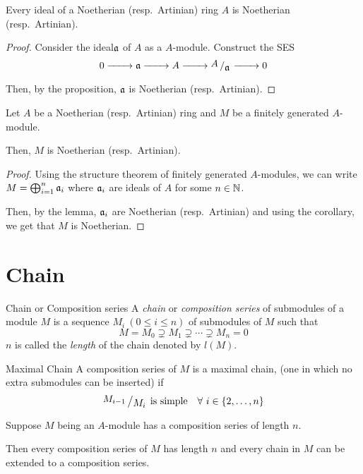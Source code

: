 \begin{lemma}{}{}
	Every ideal of a Noetherian (resp.\ Artinian) ring \(A\) is
	Noetherian (resp.\ Artinian).
\end{lemma}

\begin{proof}
	Consider the ideal\(\mathfrak{a}\) of \(A\) as a \(A\)-module.
	Construct the SES
	\[
		0 \xrightarrow[\quad\quad]{} \mfa \xrightarrow[\quad\quad]{}
		A \xrightarrow[\quad\quad]{} \bigslant{A}{\mfa}
		\xrightarrow[\quad\quad]{} 0
	\]
	Then, by the proposition, \(\mathfrak{a}\) is Noetherian (resp.\ Artinian).
\end{proof}


\begin{proposition}{}{}
	Let \(A\) be a Noetherian (resp.\ Artinian)
	ring and \(M\) be a finitely generated \(A\)-module.

	Then, \(M\) is Noetherian (resp.\ Artinian).
\end{proposition}

\begin{proof}
	Using the structure theorem of finitely generated \(A\)-modules,
	we can write \(M = \bigoplus_{i=1}^n \mathfrak{a}_i\) where \(\mathfrak{a}_i\) are
	ideals of \(A\) for some \(n \in \NN\).

	Then, by the lemma, \(\mathfrak{a}_i\) are Noetherian (resp.\ Artinian)
	and using the corollary, we get that \(M\) is Noetherian.
\end{proof}


\section{Chain}

\begin{defn}{Chain or Composition series}{}
	A \emph{chain} or \emph{composition series} of submodules
	of a module \(M\) is a sequence
	\(M_i \ (0 \leq i \leq n)\) of submodules of \(M\) such that
	\[
		M = M_0 \supsetneq M_1 \supsetneq \cdots \supsetneq M_n = 0
	\]
	\(n\) is called the \emph{length} of the chain denoted by \(l(M)\).
\end{defn}

\begin{defn}{Maximal Chain}{}
	A composition series of \(M\) is a maximal chain, (one in which
	no extra submodules can be inserted) if
	\[
		\bigslant{M_{i-1}}{M_i} \text{ is simple} \quad \forall\
		i \in \{2, \dots, n\}
	\]
\end{defn}


\begin{proposition}{}{}
	Suppose \(M\) being an \(A\)-module has a composition series of
	length \(n\).

	Then every composition series of \(M\) has length \(n\) and every
	chain in \(M\) can be extended to a composition series.
\end{proposition}

